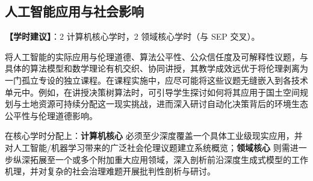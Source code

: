 \subsection{人工智能应用与社会影响}
\textbf{【学时建议】}：2 计算机核心学时，2 领域核心学时（与 SEP 交叉）。

\begin{infobox}[重要教学整合说明]
将人工智能的实际应用与伦理道德、算法公平性、公众信任度及可解释性议题，与具体的算法模型和数学理论有机交织、协同讲授，其教学成效远优于将伦理剥离为一门孤立专设的独立课程。在课程实施中，应尽可能将这些议题无缝嵌入到各技术单元中。例如，在讲授决策树算法时，可引导学生探讨如何将其应用于国土空间规划与土地资源可持续分配这一现实挑战，进而深入研讨自动化决策背后的环境生态公平性与伦理道德影响。

在核心学时分配上：\textbf{计算机核心} 必须至少深度覆盖一个具体工业级现实应用，并对人工智能/机器学习带来的广泛社会伦理议题建立系统概览；\textbf{领域核心} 则需进一步纵深拓展至一个或多个附加重大应用领域，深入剖析前沿深度生成式模型的工作机理，并对复杂的社会治理难题开展批判性剖析与研讨。
\end{infobox}

